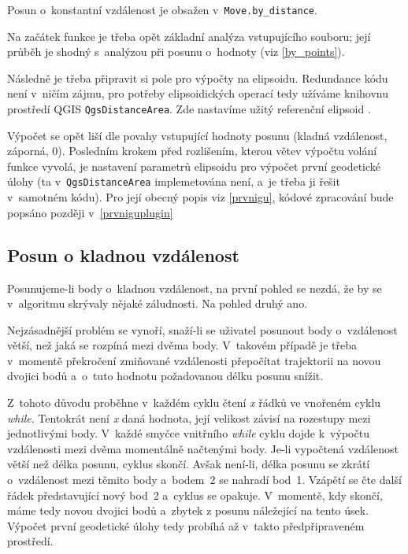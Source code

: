 Posun o~konstantní vzdálenost je obsažen v~{\tt Move.by\_distance}. 

Na začátek funkce je třeba opět základní analýza vstupujícího souboru; její průběh je shodný
s~analýzou při posunu o~hodnoty (viz \ref{by_points}). 

Následně je třeba připravit si pole pro výpočty na elipsoidu. Redundance kódu není v~ničím
zájmu, pro potřeby elipsoidických operací tedy užíváme knihovnu
prostředí QGIS {\tt QgsDistanceArea}. Zde nastavíme
užitý referenční elipsoid . 

Výpočet se opět liší dle povahy vstupující hodnoty posunu (kladná vzdálenost,
záporná, 0). Posledním krokem před rozlišením, kterou větev výpočtu volání funkce vyvolá, je nastavení
parametrů elipsoidu pro výpočet první geodetické úlohy (ta v~{\tt QgsDistanceArea} implemetována
není, a~je třeba ji řešit v~samotném kódu). Pro její obecný popis viz
\ref{prvnigu}, kódové zpracování bude popsáno později v~\ref{prvniguplugin} 

\subsection{Posun o kladnou vzdálenost}
\label{kladnavzdalenost}

Posunujeme-li body o~kladnou vzdálenost, na první pohled se nezdá, že by se v~algoritmu skrývaly
nějaké záludnosti. Na pohled druhý ano. 

Nejzásadnější problém se vynoří, snaží-li se uživatel posunout body o~vzdálenost větší, než
jaká se rozpíná mezi dvěma body. V~takovém případě je třeba v~momentě překročení zmiňované
vzdálenosti přepočítat trajektorii na novou dvojici bodů a~o~tuto hodnotu požadovanou
délku posunu snížit. 

Z~tohoto důvodu proběhne v~každém cyklu čtení \textit{x} řádků ve vnořeném cyklu \textit{while}.
Tentokrát není \textit{x} daná hodnota, její velikost závisí na rozestupy mezi jednotlivými body.
V~každé smyčce vnitřního \textit{while} cyklu dojde k~výpočtu vzdálenosti mezi dvěma momentálně
načtenými body. Je-li vypočtená vzdálenost větší než délka posunu, cyklus skončí. 
Avšak není-li, délka posunu se zkrátí o~vzdálenost mezi těmito body a~bodem~2 se nahradí bod~1.
Vzápětí se čte další řádek představující nový bod~2 a~cyklus se opakuje. V~momentě, kdy
skončí, máme tedy novou dvojici bodů a~zbytek z posunu náležející na tento úsek.
Výpočet první geodetické úlohy tedy probíhá až v~takto předpřipraveném prostředí. 

